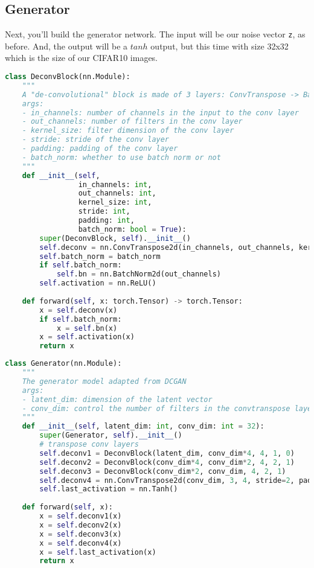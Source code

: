 \subsection{Generator}

Next, you'll build the generator network. The input will be our noise
vector \lstinline{z}, as before. And, the output will be a
\(tanh\) output, but this time with size 32x32 which is the size of our
CIFAR10 images.

\begin{lstlisting}[language=Python]
class DeconvBlock(nn.Module):
    """
    A "de-convolutional" block is made of 3 layers: ConvTranspose -> BatchNorm -> Activation.
    args:
    - in_channels: number of channels in the input to the conv layer
    - out_channels: number of filters in the conv layer
    - kernel_size: filter dimension of the conv layer
    - stride: stride of the conv layer
    - padding: padding of the conv layer
    - batch_norm: whether to use batch norm or not
    """
    def __init__(self, 
                 in_channels: int, 
                 out_channels: int, 
                 kernel_size: int, 
                 stride: int,
                 padding: int,
                 batch_norm: bool = True):
        super(DeconvBlock, self).__init__()
        self.deconv = nn.ConvTranspose2d(in_channels, out_channels, kernel_size, stride, padding, bias=False)
        self.batch_norm = batch_norm
        if self.batch_norm:
            self.bn = nn.BatchNorm2d(out_channels)
        self.activation = nn.ReLU()
        
    def forward(self, x: torch.Tensor) -> torch.Tensor:
        x = self.deconv(x)
        if self.batch_norm:
            x = self.bn(x)
        x = self.activation(x)
        return x
\end{lstlisting}

\begin{lstlisting}[language=Python]
class Generator(nn.Module):
    """
    The generator model adapted from DCGAN
    args:
    - latent_dim: dimension of the latent vector
    - conv_dim: control the number of filters in the convtranspose layers
    """
    def __init__(self, latent_dim: int, conv_dim: int = 32):
        super(Generator, self).__init__()
        # transpose conv layers
        self.deconv1 = DeconvBlock(latent_dim, conv_dim*4, 4, 1, 0)
        self.deconv2 = DeconvBlock(conv_dim*4, conv_dim*2, 4, 2, 1)
        self.deconv3 = DeconvBlock(conv_dim*2, conv_dim, 4, 2, 1)
        self.deconv4 = nn.ConvTranspose2d(conv_dim, 3, 4, stride=2, padding=1)
        self.last_activation = nn.Tanh()
        
    def forward(self, x):
        x = self.deconv1(x)
        x = self.deconv2(x)
        x = self.deconv3(x)
        x = self.deconv4(x)
        x = self.last_activation(x)
        return x
    
\end{lstlisting}

